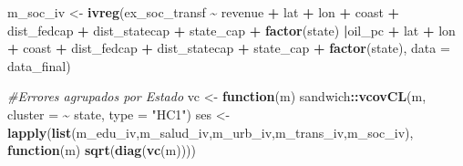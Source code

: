 \documentclass[
]{article}
\newenvironment{Shaded}{\begin{snugshade}}{\end{snugshade}}
\newcommand{\AttributeTok}[1]{\textcolor[rgb]{0.13,0.29,0.53}{#1}}
\newcommand{\CommentTok}[1]{\textcolor[rgb]{0.56,0.35,0.01}{\textit{#1}}}
\newcommand{\ControlFlowTok}[1]{\textcolor[rgb]{0.13,0.29,0.53}{\textbf{#1}}}
\newcommand{\FunctionTok}[1]{\textcolor[rgb]{0.13,0.29,0.53}{\textbf{#1}}}
\newcommand{\NormalTok}[1]{#1}
\newcommand{\OtherTok}[1]{\textcolor[rgb]{0.56,0.35,0.01}{#1}}
\newcommand{\SpecialCharTok}[1]{\textcolor[rgb]{0.81,0.36,0.00}{\textbf{#1}}}
\newcommand{\StringTok}[1]{\textcolor[rgb]{0.31,0.60,0.02}{#1}}
\begin{document}
\begin{Shaded}
\begin{Highlighting}[]
\NormalTok{m\_soc\_iv   }\OtherTok{\textless{}{-}} \FunctionTok{ivreg}\NormalTok{(ex\_soc\_transf     }\SpecialCharTok{\textasciitilde{}}\NormalTok{ revenue }\SpecialCharTok{+}\NormalTok{ lat }\SpecialCharTok{+}\NormalTok{ lon }\SpecialCharTok{+}\NormalTok{ coast }\SpecialCharTok{+}\NormalTok{ dist\_fedcap }\SpecialCharTok{+}\NormalTok{ dist\_statecap }\SpecialCharTok{+}\NormalTok{ state\_cap }\SpecialCharTok{+} \FunctionTok{factor}\NormalTok{(state) }\SpecialCharTok{|}\NormalTok{oil\_pc }\SpecialCharTok{+}\NormalTok{ lat }\SpecialCharTok{+}\NormalTok{ lon }\SpecialCharTok{+}\NormalTok{ coast }\SpecialCharTok{+}\NormalTok{ dist\_fedcap }\SpecialCharTok{+}\NormalTok{ dist\_statecap }\SpecialCharTok{+}\NormalTok{ state\_cap }\SpecialCharTok{+} \FunctionTok{factor}\NormalTok{(state), }\AttributeTok{data =}\NormalTok{ data\_final)}

\CommentTok{\#Errores agrupados por Estado }
\NormalTok{vc }\OtherTok{\textless{}{-}} \ControlFlowTok{function}\NormalTok{(m) sandwich}\SpecialCharTok{::}\FunctionTok{vcovCL}\NormalTok{(m, }\AttributeTok{cluster =} \SpecialCharTok{\textasciitilde{}}\NormalTok{ state, }\AttributeTok{type =} \StringTok{"HC1"}\NormalTok{)}
\NormalTok{ses }\OtherTok{\textless{}{-}} \FunctionTok{lapply}\NormalTok{(}\FunctionTok{list}\NormalTok{(m\_edu\_iv,m\_salud\_iv,m\_urb\_iv,m\_trans\_iv,m\_soc\_iv), }\ControlFlowTok{function}\NormalTok{(m) }\FunctionTok{sqrt}\NormalTok{(}\FunctionTok{diag}\NormalTok{(}\FunctionTok{vc}\NormalTok{(m))))}


\end{Highlighting}
\end{Shaded}
\end{document}
